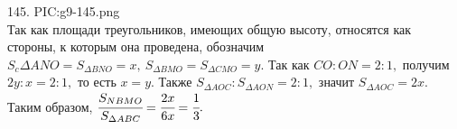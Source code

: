 145. {{PIC:g9-145.png}}\\
Так как площади треугольников, имеющих общую высоту, относятся как стороны, к которым она проведена, обозначим $S_c{\Delta ANO}=S_{\Delta BNO}=x,\ S_{\Delta BMO}=S_{\Delta CMO}=y.$ Так как $CO:ON=2:1,$ получим $2y:x=2:1,$ то есть $x=y.$ Также $S_{\Delta AOC}:S_{\Delta AON}=2:1,$ значит $S_{\Delta AOC}=2x.$ Таким образом, $\cfrac{S_{NBMO}}{S_{\Delta ABC}}=\cfrac{2x}{6x}=\cfrac{1}{3}.$\\
